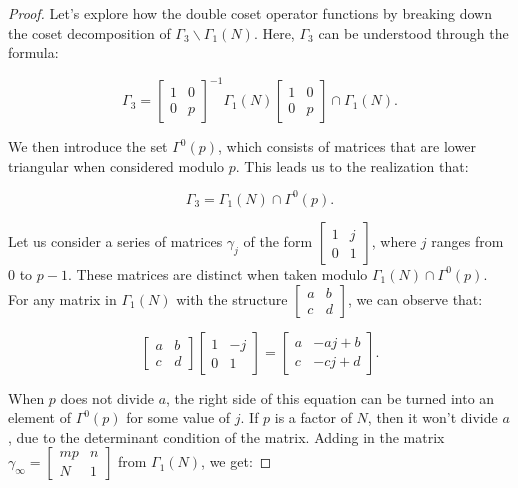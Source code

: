 \begin{proof}
Let's explore how the double coset operator functions by breaking down the coset decomposition of \( \Gamma_{3} \backslash \Gamma_{1}(N) \). Here, \( \Gamma_{3} \) can be understood through the formula:

\[
\Gamma_{3}=\left[\begin{array}{cc}
1 & 0 \\
0 & p
\end{array}\right]^{-1} \Gamma_{1}(N)\left[\begin{array}{cc}
1 & 0 \\
0 & p
\end{array}\right] \cap \Gamma_{1}(N).
\]

We then introduce the set \( \Gamma^{0}(p) \), which consists of matrices that are lower triangular when considered modulo \( p \). This leads us to the realization that:

\[
\Gamma_{3}=\Gamma_{1}(N) \cap \Gamma^{0}(p).
\]

Let us consider a series of matrices \( \gamma_{j} \) of the form \( \left[\begin{array}{cc}1 & j \\ 0 & 1\end{array}\right] \), where \( j \) ranges from 0 to \( p-1 \). These matrices are distinct when taken modulo \( \Gamma_{1}(N) \cap \Gamma^{0}(p) \). For any matrix in \( \Gamma_{1}(N) \) with the structure \( \left[\begin{array}{cc}a & b \\ c & d\end{array}\right] \), we can observe that:

\[
\left[\begin{array}{cc}
a & b \\
c & d
\end{array}\right]\left[\begin{array}{cc}
1 & -j \\
0 & 1
\end{array}\right]=\left[\begin{array}{cc}
a & -a j+b \\
c & -c j+d
\end{array}\right].
\]

When \( p \) does not divide \( a \), the right side of this equation can be turned into an element of \( \Gamma^{0}(p) \) for some value of \( j \). If \( p \) is a factor of \( N \), then it won't divide \( a \), due to the determinant condition of the matrix. Adding in the matrix \( \gamma_{\infty}=\left[\begin{array}{cc}m p & n \\ N & 1\end{array}\right] \) from \( \Gamma_{1}(N) \), we get:


\end{proof}
